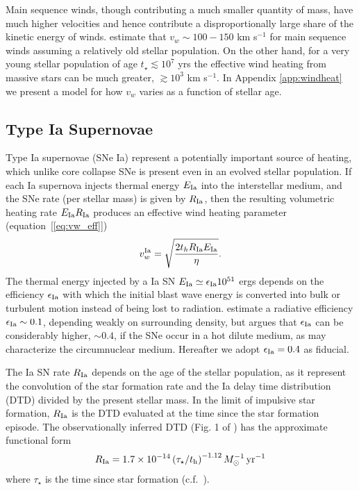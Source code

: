 \documentclass[usenatbib,fleqn]{mn2e}
\newcommand{\RateIa}{R_{\rm Ia}}
\begin{document}
Main sequence winds, though contributing a much smaller quantity of
mass, have much higher velocities and hence contribute a
disproportionally large share of the kinetic energy of winds.
\citet{NaimanSoares-Furtado+:2013a} estimate that $v_{w} \sim
100-150$ km s$^{-1}$ for main sequence winds assuming a relatively old
stellar population.  On the other hand, for a very young stellar
population of age $t_{\star} \lesssim 10^{7}$ yrs the effective wind
heating from massive stars can be much greater, $\gtrsim 10^{3}$ km
s$^{-1}$.  In Appendix \ref{app:windheat} we present a model for
how $v_{w}$ varies as a function of stellar age.

\subsection{Type Ia Supernovae} 

Type Ia supernovae (SNe Ia) represent a potentially important source of heating, which unlike core collapse SNe is present even in an evolved stellar population.  If each Ia supernova injects thermal energy $E_{\rm Ia}$ into the interstellar medium, and the SNe rate (per stellar mass) is given by $R_{\rm   Ia}$, then the resulting volumetric heating rate $E_{\rm Ia}R_{\rm  Ia}$ produces an effective wind heating parameter (equation~[\ref{eq:vw_eff}]) \begin{align} v_{w}^{\rm Ia} =\sqrt{\frac{2 t_h R_{\rm Ia}
E_{\rm Ia}}{\eta}} \label{eq:vw_sne}.
\end{align} The thermal energy injected by a Ia SN $E_{\rm Ia} \simeq
\epsilon_{\rm Ia} 10^{51}$ ergs depends on the efficiency $\epsilon_{\rm Ia}$
with which the initial blast wave energy is converted into bulk or turbulent
motion instead of being lost to radiation.  \cite{Thornton+98}
estimate a radiative efficiency $\epsilon_{\rm Ia} \sim 0.1$,
depending weakly on surrounding density, but \citet{Sharma+14} argues
that $\epsilon_{\rm Ia}$ can be considerably higher, $\sim 0.4$, if
the SNe occur in a hot dilute medium, as may characterize the circumnuclear medium.  Hereafter we adopt $\epsilon_{\rm Ia} = 0.4$ as fiducial.

The Ia SN rate $\RateIa$ depends on the age of the stellar population, as it represent the convolution of the star formation rate and the Ia delay time distribution (DTD) divided by the present stellar mass.  In
the limit of impulsive star formation, $\RateIa$ is the DTD evaluated at the time since the star formation episode.  The observationally inferred DTD (Fig. 1 of \citealt{MaozMannucci+:2012a}) has the
approximate functional form \begin{align}
  R_{\rm Ia} =1.7\times 10^{-14}\left(\tau_{\star}/t_{\rm
      h}\right)^{-1.12} M_{\odot}^{-1}\,{\rm yr^{-1}}
\label{eq:DTD}
  \end{align}
  where $\tau_{\star}$ is the time since star formation
  (c.f.~\citealt{Scannapieco&Bildsten05}). 
\end{document}
